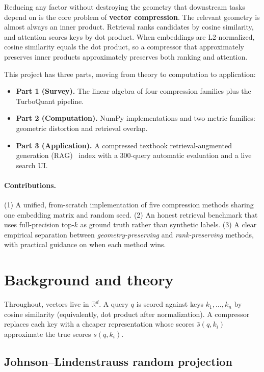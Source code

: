 \documentclass[11pt]{article}
\begin{document}
Reducing any factor without destroying the geometry that downstream tasks depend on is the core problem of \textbf{vector compression}. The relevant geometry is almost always an inner product. Retrieval ranks candidates by cosine similarity, and attention scores keys by dot product. When embeddings are L2-normalized, cosine similarity equals the dot product, so a compressor that approximately preserves inner products approximately preserves both ranking and attention.

This project has three parts, moving from theory to computation to application:
\begin{itemize}
  \item \textbf{Part 1 (Survey).} The linear algebra of four compression families plus the TurboQuant pipeline.
  \item \textbf{Part 2 (Computation).} NumPy implementations and two metric families: geometric distortion and retrieval overlap.
  \item \textbf{Part 3 (Application).} A compressed textbook retrieval-augmented generation (RAG)~\cite{rag2020} index with a 300-query automatic evaluation and a live search UI.
\end{itemize}

\paragraph{Contributions.}
(1) A unified, from-scratch implementation of five compression methods sharing one embedding matrix and random seed. (2) An honest retrieval benchmark that uses full-precision top-$k$ as ground truth rather than synthetic labels. (3) A clear empirical separation between \emph{geometry-preserving} and \emph{rank-preserving} methods, with practical guidance on when each method wins.

\section{Background and theory}

Throughout, vectors live in $\mathbb{R}^d$. A query $q$ is scored against keys $k_1, \ldots, k_n$ by cosine similarity (equivalently, dot product after normalization). A compressor replaces each key with a cheaper representation whose scores $\hat{s}(q, k_i)$ approximate the true scores $s(q, k_i)$.

\subsection{Johnson--Lindenstrauss random projection}
\end{document}
